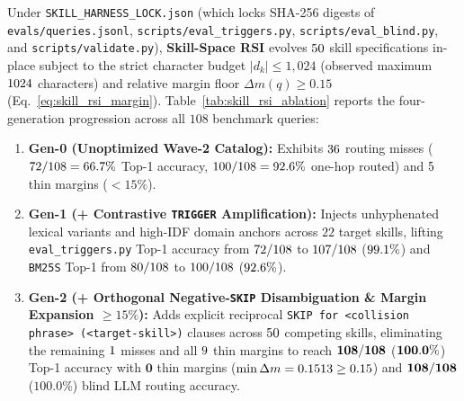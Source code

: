 Under \texttt{SKILL\_HARNESS\_LOCK.json} (which locks SHA-256 digests of \texttt{evals/\allowbreak queries.jsonl}, \texttt{scripts/\allowbreak eval\_\allowbreak triggers.py}, \texttt{scripts/\allowbreak eval\_\allowbreak blind.py}, and \texttt{scripts/\allowbreak validate.py}), \textbf{Skill-Space RSI} evolves $50{}$ skill specifications in-place subject to the strict character budget $|d_k| \le 1{,}024$ (observed maximum $1024{}$ characters) and relative margin floor $\Delta m(q) \ge 0.15$ (Eq.~\ref{eq:skill_rsi_margin}). Table~\ref{tab:skill_rsi_ablation} reports the four-generation progression across all $108$ benchmark queries:
\begin{enumerate}
\item \textbf{Gen-0 (Unoptimized Wave-2 Catalog):} Exhibits $36{}$ routing misses ($72{}/108 = 66.7{}\%$ Top-1 accuracy, $100{}/108 = 92.6{}\%$ one-hop routed) and $5{}$ thin margins ($<15\%$).
\item \textbf{Gen-1 (+ Contrastive \texttt{TRIGGER} Amplification):} Injects unhyphenated lexical variants and high-IDF domain anchors across $22$ target skills, lifting \texttt{eval\_triggers.py} Top-1 accuracy from $72{}/108$ to $107{}/108$ ($99.1{}\%$) and \texttt{BM25S} Top-1 from $80{}/108$ to $100{}/108$ ($92.6{}\%$).
\item \textbf{Gen-2 (+ Orthogonal Negative-\texttt{SKIP} Disambiguation \& Margin Expansion $\ge 15\%$):} Adds explicit reciprocal \texttt{SKIP for <collision phrase> (<target-skill>)} clauses across $50{}$ competing skills, eliminating the remaining $1{}$ misses and all $9{}$ thin margins to reach $\mathbf{108{}/108}$ ($\mathbf{100.0{}\%}$) Top-1 accuracy with $\mathbf{0}$ thin margins ($\min \Delta m = 0.1513{} \ge 0.15$) and $\mathbf{108{}/108}$ ($\mathbf{100.0\%}$) blind LLM routing accuracy.

\end{enumerate}
